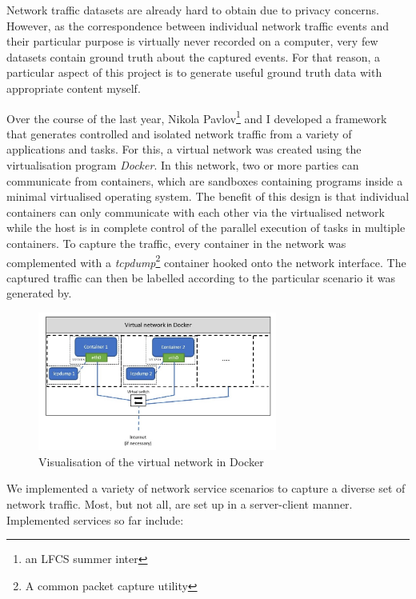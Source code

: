 \documentclass[a4paper,12pt,twoside]{report}
\begin{document}
Network traffic datasets are already hard to obtain due to privacy concerns. However, as  the correspondence between individual network traffic events and their particular purpose is virtually never recorded on a computer, very few datasets contain ground truth about the captured events. For that reason, a particular aspect of this project is to generate useful ground truth data with appropriate content myself.

Over the course of the last year, Nikola Pavlov\footnote{an LFCS summer inter} and I developed a framework that generates controlled and isolated network traffic from a variety of applications and tasks. For this, a virtual network was created using the virtualisation program \textit{Docker}. In this network, two or more parties can communicate from containers,  which are sandboxes containing programs inside a minimal virtualised operating system. The benefit of this design is that individual containers can only communicate with each other via the virtualised network while the host is in complete control of the parallel execution of tasks in multiple containers. To capture the traffic, every container in the network was complemented with a \textit{tcpdump}\footnote{A common packet capture utility} container hooked onto the network interface. The captured traffic can then be labelled according to the particular scenario it was generated by.


\begin{figure}
\centering
\includegraphics[width=0.7\textwidth]{images/Dockernet.jpg}
\caption{Visualisation of the virtual network in Docker}\label{docker}
\end{figure}

We implemented a variety of network service  scenarios to capture a diverse set of network traffic. Most, but not all, are set up in a server-client manner. Implemented services so far include:
\end{document}
